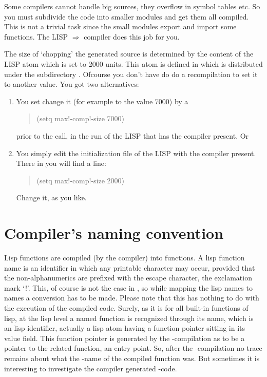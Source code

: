 Some \C compilers cannot handle big sources, they overflow in
symbol tables etc. So you must subdivide the code into smaller
modules and get them all compiled.  This is not a trivial task
since the small modules export and import some \C functions.
The LISP $\Rightarrow$ \C compiler does this job for you.

The size of `chopping' the generated \C source
is determined by  the content of
the LISP atom \mbox{} which is set to 2000 units.
This atom is defined in  which is distributed
under the subdirectory . Ofcourse you don't have
do do a recompilation to set it to another value. You got
two alternatives:
\begin{enumerate}
 \item
   You set change it (for example to the value 7000)
   by a
   \begin{quote}
      (setq max!-comp!-size 7000)
   \end{quote}
   prior to the   call, in the run of the
   LISP that has the compiler present. Or
 \item
   You simply edit the initialization file of the LISP with the compiler
   present.   There in you will find a line:
\begin{quote}
      (setq max!-comp!-size 2000)
   \end{quote}
  Change it, as you like.
\end{enumerate}


 
\section{Compiler's naming convention}

Lisp functions are compiled (by the compiler) into \C functions.
A lisp function name is an identifier in which any printable character
may occur, provided that the non-alphanumerics are prefixed with the
escape character, the exclamation mark `!'. This, of course is not the
case in \CC, so while mapping the lisp names to \C names a
conversion has to be made. Please note that this has nothing to do
with the execution of the compiled code. Surely, as it is for all built-in
functions of lisp, at the lisp level a named
function is recognized through its name, which is an lisp identifier,
actually a lisp atom having a function pointer sitting in its value field.
This function pointer is generated by the \CC-compilation as to be a pointer
to the related function, an entry point. So, after the \CC-compilation
no trace remains about what the \CC-name of the compiled function was.
But sometimes it is interesting to investigate the compiler generated
\CC-code.

